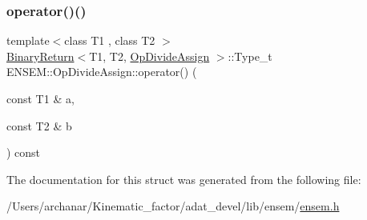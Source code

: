 \mbox{\label{structENSEM_1_1OpDivideAssign_a16a1ece4c032ceb92428ac26535c4ae9}} 
\subsubsection{\texorpdfstring{operator()()}{operator()()}\hspace{0.1cm}{\footnotesize\ttfamily [2/2]}}
{\footnotesize\ttfamily template$<$class T1 , class T2 $>$ \\
\mbox{\hyperlink{structENSEM_1_1BinaryReturn}{Binary\+Return}}$<$T1, T2, \mbox{\hyperlink{structENSEM_1_1OpDivideAssign}{Op\+Divide\+Assign}} $>$\+::Type\+\_\+t E\+N\+S\+E\+M\+::\+Op\+Divide\+Assign\+::operator() (\begin{DoxyParamCaption}\item[{const T1 \&}]{a,  }\item[{const T2 \&}]{b }\end{DoxyParamCaption}) const\hspace{0.3cm}{\ttfamily [inline]}}



The documentation for this struct was generated from the following file\+:\begin{DoxyCompactItemize}
\item 
/\+Users/archanar/\+Kinematic\+\_\+factor/adat\+\_\+devel/lib/ensem/\mbox{\hyperlink{lib_2ensem_2ensem_8h}{ensem.\+h}}\end{DoxyCompactItemize}
